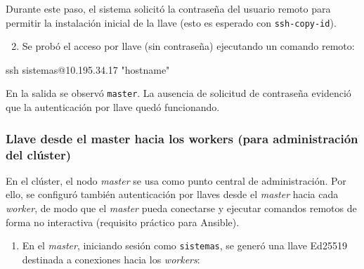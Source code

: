 Durante este paso, el sistema solicitó la contraseña del usuario remoto para permitir la instalación inicial de la llave (esto es esperado con \texttt{ssh-copy-id}). \cite{man_ssh_copy_id}


\begin{enumerate}
  \setcounter{enumi}{1}
  \item Se probó el acceso por llave (sin contraseña) ejecutando un comando remoto:
\end{enumerate}

\begin{terminalblock}
ssh sistemas@10.195.34.17 "hostname"
\end{terminalblock}

En la salida se observó \texttt{master}. La ausencia de solicitud de contraseña evidenció que la autenticación por llave quedó funcionando.


\subsubsection*{Llave desde el master hacia los workers (para administración del clúster)}
En el clúster, el nodo \textit{master} se usa como punto central de administración. Por ello, se configuró también autenticación por llaves desde el \textit{master} hacia cada \textit{worker}, de modo que el \textit{master} pueda conectarse y ejecutar comandos remotos de forma no interactiva (requisito práctico para Ansible). \cite{rhel_key_pairs_ssh}

\begin{enumerate}
  \item En el \textit{master}, iniciando sesión como \texttt{sistemas}, se generó una llave Ed25519 destinada a conexiones hacia los \textit{workers}:
\end{enumerate}

